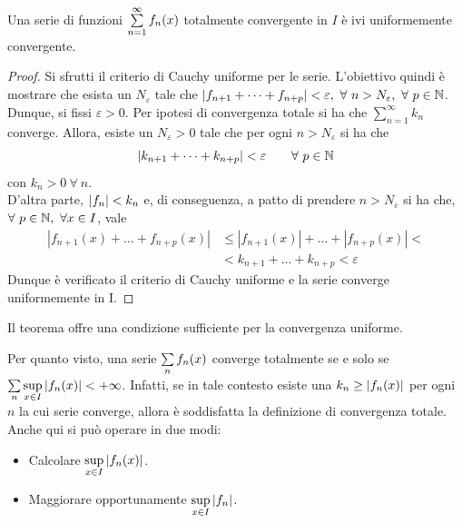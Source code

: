 \begin{theorem} \label{Teo: Criterio di Weierstrass (convergenza totale)}
Una serie di funzioni $\sum\limits_{n=1}^{\infty}{f_n(x)}$ totalmente convergente in $I$ è ivi uniformemente convergente.
\end{theorem}
\begin{proof}
    Si sfrutti il criterio di Cauchy uniforme per le serie. L'obiettivo quindi è mostrare che esista un $N_\varepsilon$ tale che $|f_{n+1}+ \dots+ f_{n+p}|< \varepsilon,\ \forall\ n > N_\varepsilon,\ \forall\ p\in \mathbb{N}$.\\
    Dunque, si fissi $\varepsilon>0$. Per ipotesi di convergenza totale si ha che $\sum\limits_{n=1}^{\infty}{k_n}$ converge. Allora, esiste un $N_\varepsilon>0$ tale che per ogni $n>N_\varepsilon$ si ha che 
    \begin{equation*}
        |k_{n+1}+\dots+k_{n+p}|< \varepsilon \qquad \forall\ p \in \mathbb{N}
    \end{equation*}
   con $k_n>0\ \forall\ n$.\\
   D'altra parte, $|f_n|<k_n$ e, di conseguenza, a patto di prendere $n> N_\varepsilon$ si ha che, $\forall\ p \in \mathbb{N},\ \forall x \in I$, vale
    \begin{equation*}
    \begin{aligned}
        |f_{n+1}(x)+ \dots + f_{n+p}(x)| &\leq |f_{n+1}(x)|+ \dots + |f_{n+p}(x)|<\\ 
        &< k_{n+1}+ \dots + k_{n+p} < \varepsilon
    \end{aligned}
    \end{equation*}
    Dunque è verificato il criterio di Cauchy uniforme e la serie converge uniformemente in I.
\end{proof}
\begin{oss}
    Il teorema offre una condizione sufficiente per la convergenza uniforme.
\end{oss}
\begin{oss}
Per quanto visto, una serie $\sum\limits_{n}{f_n(x)}$ converge totalmente se e solo se $\sum\limits_{n}{\sup\limits_{x \in I}{|f_n(x)|}} < +\infty$. Infatti, se in tale contesto esiste una $k_n \geq |f_n(x)|$ per ogni $n$ la cui serie converge, allora è soddisfatta la definizione di convergenza totale.\\
Anche qui si può operare in due modi:
\begin{itemize}
    \item Calcolare $\sup\limits_{x \in I}{|f_n(x)|}$.
    \item Maggiorare opportunamente $\sup\limits_{x \in I}{|f_n|}$.
\end{itemize}
\end{oss}
